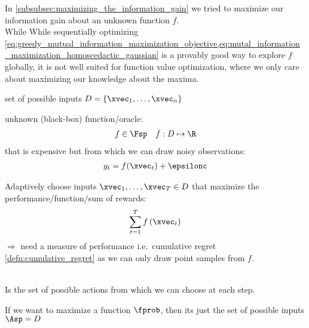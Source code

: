 \begin{sectionbox}\nospacing
  In \cref{subsubsec:maximizing_the_information_gain} we tried to maximize our information gain about an unknown function $f$.\\
  While While sequentially optimizing \cref{eq:greedy_mutual_information_maximization_objective,eq:mutal_information_maximization_homoscedactic_gaussian}
  is a provably good way to explore $f$ globally, it is not well suited for function value optimization, where we only
  care about maximizing our knowledge about the maxima.
\end{sectionbox}
\begin{sectionbox}[Given]\nospacing
  \begin{itemizenosep}
    \item set of possible inputs $D=\left\{\xvec_{1},\ldots,\xvec_{n}\right\}$
    \item unknown (black-box) function/oracle:
    \begin{align}
      f\in\Fsp&&f:D\mapsto\R
    \end{align}
    that is expensive but from which we can draw noisy observations:
    \begin{align}
      y_t=f(\xvec_t)+\epsilonc
    \end{align}
  \end{itemizenosep}
\end{sectionbox}
\begin{sectionbox}[Goal]\nospacing
  Adaptively choose inputs $\xvec_1,\ldots,\xvec_{T}\in D$ that maximize
  the performance/function/sum of rewards:
  \begin{align}
    \sum_{t=1}^{T}f\left(\xvec_t\right)
  \end{align}
  $\Rightarrow$ need a measure of performance i.e.\ cumulative regret \cref{defn:cumulative_regret}
  as we can only draw point samples from $f$.
\end{sectionbox}
\begin{defnbox}\nospacing
  \begin{defn}[\newline Action Set\hfill\tc{black}{$\Asp=\left\{a_{1},\ldots,a_{n}\right\}$}]\label{defn:action_set}\leavevmode\\
    Is the set of possible actions from which we can choose at each step.
  \end{defn}
\end{defnbox}
\begin{corbox}\nospacing
  \begin{cor}
    If we want to maximize a function $\fprob$, then its just the
    set of possible inputs $\Asp=D$
  \end{cor}
\end{corbox}
